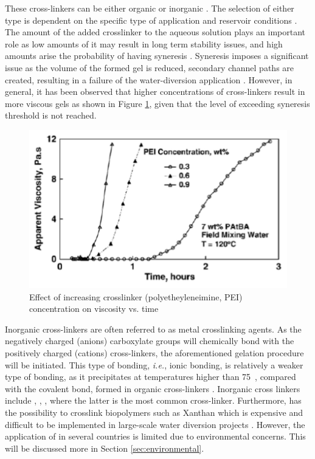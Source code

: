 These cross-linkers can be either organic or inorganic \citep{Al-Muntasheri2012}. The selection of either type is dependent on the specific type of application and reservoir conditions \citep{Ball1984}. The amount of the added crosslinker to the aqueous solution plays an important role as low amounts of it may result in long term stability issues, and high amounts arise the probability of having syneresis \citep{Sydansk1993, eggert1992}. Syneresis imposes a significant issue as the volume of the formed gel is reduced, secondary channel paths are created, resulting in a failure of the water-diversion application \citep{Al-Muntasheri2007}. However, in general, it has been observed that higher concentrations of cross-linkers result in more viscous gels as shown in Figure \ref{fig:crosslinkerConc}, given that the level of exceeding syneresis threshold is not reached.

\begin{figure}
    \centering
    \includegraphics[width=\textwidth]{img/fig/crosslinkerConc.png}
    \caption{Effect of increasing crosslinker (polyetheyleneimine, PEI) concentration on viscosity vs. time \citep{Al-Muntasheri2007}}
    \label{fig:crosslinkerConc} %
\end{figure}

Inorganic cross-linkers are often referred to as metal crosslinking agents. As the negatively charged (anions) carboxylate groups will chemically bond with the positively charged (cations) cross-linkers, the aforementioned gelation procedure will be initiated. This type of bonding, \textit{i.e.}, ionic bonding, is relatively a weaker type of bonding, as it precipitates at temperatures higher than 75~\celsius, compared with the covalent bond, formed in organic cross-linkers \citep{Al-Muntasheri2005}. Inorganic cross linkers include , , , where the latter is the most common cross-linker. Furthermore,  has the possibility to crosslink biopolymers such as Xanthan which is expensive and difficult to be implemented in large-scale water diversion projects \citep{Al-Muntasheri2012}. However, the application of  in several countries is limited due to environmental concerns. This will be discussed more in Section \ref{sec:environmental}.

